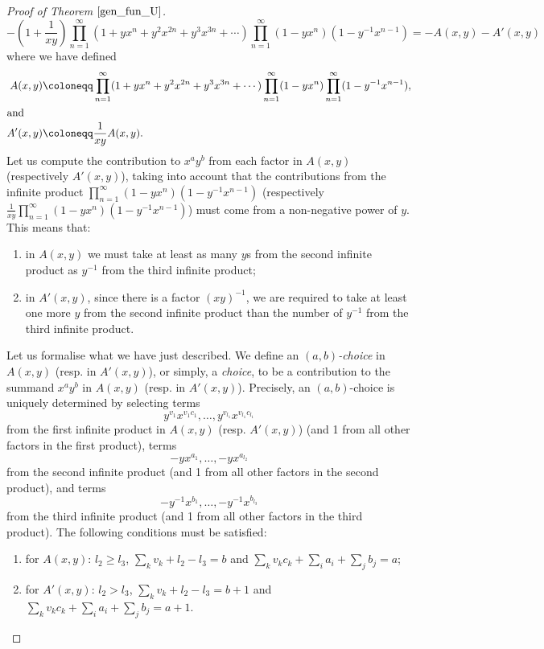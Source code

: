 \documentclass[a4paper, 12pt, oneside]{amsart}
\theoremstyle{definition}
\begin{document}
\begin{proof}[Proof of Theorem $\ref{gen_fun_U}$]
\begin{equation}
\label{-A-A'}
-\left(1+\frac{1}{xy}\right)\prod_{n=1}^{\infty}(1+yx^n+y^2x^{2n}+y^3x^{3n}+\cdots)\prod_{n=1}^{\infty}(1-yx^n)(1-y^{-1}x^{n-1})
=-A(x,y)-A'(x,y)
\end{equation}
where we have defined
\begin{align*}
A(x,y)&\coloneqq \prod_{n=1}^{\infty}(1+yx^n+y^2x^{2n}+y^3x^{3n}+\cdots)\prod_{n=1}^{\infty}(1-yx^n)\prod_{n=1}^{\infty}(1-y^{-1}x^{n-1}), \\
\intertext{and}
A'(x,y)&\coloneqq\frac{1}{xy}A(x,y).
\end{align*}
Let us compute the contribution to $x^ay^b$ from each factor in $A(x,y)$ (respectively $A'(x,y)$), taking into account that the contributions from the infinite product $\prod_{n=1}^{\infty}(1-yx^n)(1-y^{-1}x^{n-1})$ (respectively $\frac{1}{xy}\prod_{n=1}^{\infty}(1-yx^n)(1-y^{-1}x^{n-1})$) must come from a non-negative power of $y$. This means that:
\begin{enumerate}
    \item in $A(x,y)$ we must take at least as many $y$s from the second infinite product as $y^{-1}$ from the third infinite product;
    \item in $A'(x,y)$, since there is a factor $(xy)^{-1}$, we are required to take at least one more $y$ from the second infinite product than the number of $y^{-1}$ from the third infinite product.
\end{enumerate}
Let us formalise what we have just described. 
We define an  \textit{$(a,b)$-choice} in $A(x,y)$ (resp. in $A'(x,y)$), or simply, a \textit{choice}, to be a contribution to the summand $x^ay^b$ in $A(x,y)$ (resp. in $A'(x,y)$). Precisely, an $(a,b)$-choice is uniquely determined by selecting terms $$y^{v_1}x^{v_1c_1},\dots,y^{v_{l_1}}x^{v_{l_1}c_{l_1}}$$ from the first infinite product in $A(x,y)$ (resp. $A'(x,y)$) (and 1 from all other factors in the first  product), terms $$-yx^{a_1},\dots,-yx^{a_{l_2}}$$ from the second infinite product (and 1 from all other factors in the second product), and terms $$-y^{-1}x^{b_1},\dots,-y^{-1}x^{b_{l_3}}$$ from the third infinite product (and 1 from all other factors in the third product). 
The following conditions must be satisfied:
\begin{enumerate}
    \item for $A(x,y)$: $l_2 \ge l_3$, $\sum_k v_k+l_2-l_3=b$ and $\sum_k v_k c_k+\sum_ia_i+\sum_j b_j=a$;
    \item for $A'(x,y)$: $l_2 > l_3$, $\sum_k v_k+l_2-l_3=b+1$ and $\sum_k v_k c_k+\sum_ia_i+\sum_j b_j=a+1$.
\end{enumerate}


\end{proof}
\end{document}

